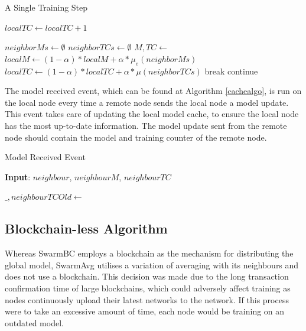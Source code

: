 \documentclass[letterpaper, 10 pt, conference]{ieeeconf}  %
\begin{document}
\begin{algorithm}[H]
	\caption{A Single Training Step} \label{updatealgo}
	\label{mainalgo}
	\begin{algorithmic}[1]
		\State {}
		\State $localTC \gets localTC + 1$
		\State {}
		\EndFor
		
		\State $neighborMs \gets \emptyset$
		\State $neighborTCs \gets \emptyset$
		\State $M, TC \gets$ 
		\State {}
		\State {}
		\EndIf
		\EndFor
		\State $localM \gets (1 - \alpha) * localM + \alpha * \mu_e(neighborMs)$ \label{updatelm}
		\State $localTC \gets (1 - \alpha) * localTC + \alpha * \mu(neighborTCs)$ \label{updatetc}
		\State break
		\Else
		\State {}
		\State continue
		\EndIf
		\EndFor
	\end{algorithmic}
\end{algorithm}

The model received event, which can be found at Algorithm \ref{cachealgo}, is run on the local node every time a remote node sends the local node a model update. This event takes care of updating the local model cache, to ensure the local node has the most up-to-date information. The model update sent from the remote node should contain the model and training counter of the remote node.

\begin{algorithm}[H]
	\caption{Model Received Event} \label{cachealgo}
	\textbf{Input}: $neighbour$, $neighbourM$, $neighbourTC$
	\newline
	\begin{algorithmic}[1]
		\State $\_, neighbourTCOld \gets$ 
		\State {}
		\EndIf
		\Else
		\State {}
		\EndIf
	\end{algorithmic}
\end{algorithm}

\subsection{Blockchain-less Algorithm}
Whereas SwarmBC employs a blockchain as the mechanism for distributing the global model, SwarmAvg utilises a variation of averaging with its neighbours and does not use a blockchain. This decision was made due to the long transaction confirmation time of large blockchains, which could adversely affect training as nodes continuously upload their latest networks to the network. If this process were to take an excessive amount of time, each node would be training on an outdated model. \\
\end{document}
